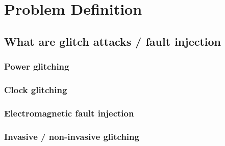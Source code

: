 \chapter{Problem Definition}
\label{chap2}

\section{What are glitch attacks / fault injection}
\label{sec:glitch}

\subsection{Power glitching}

\subsection{Clock glitching}

\subsection{Electromagnetic fault injection}

\subsection{Invasive / non-invasive glitching}
